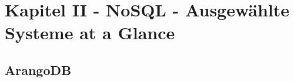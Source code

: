 \chapter{Kapitel II - NoSQL - Ausgewählte Systeme at a Glance}
\setcounter{section}{7}
\section{ArangoDB}
